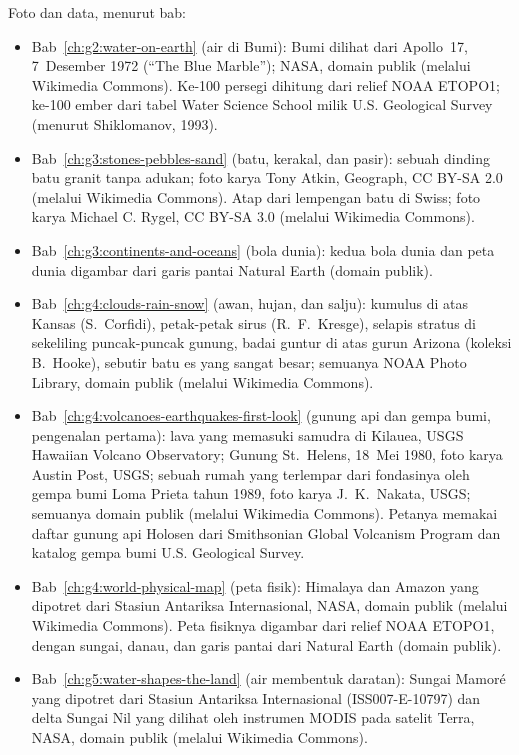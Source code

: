 \bigskip
\noindent Foto dan data, menurut bab:
\begin{itemize}\small
  \item Bab~\ref{ch:g2:water-on-earth} (air di Bumi): Bumi dilihat dari Apollo~17, 7~Desember 1972 (``The Blue Marble''); NASA, domain publik (melalui Wikimedia Commons). Ke-100 persegi dihitung dari relief NOAA ETOPO1; ke-100 ember dari tabel Water Science School milik U.S. Geological Survey (menurut Shiklomanov, 1993).
  \item Bab~\ref{ch:g3:stones-pebbles-sand} (batu, kerakal, dan pasir): sebuah dinding batu granit tanpa adukan; foto karya Tony Atkin, Geograph, CC BY-SA 2.0 (melalui Wikimedia Commons). Atap dari lempengan batu di Swiss; foto karya Michael C. Rygel, CC BY-SA 3.0 (melalui Wikimedia Commons).
  \item Bab~\ref{ch:g3:continents-and-oceans} (bola dunia): kedua bola dunia dan peta dunia digambar dari garis pantai Natural Earth (domain publik).
  \item Bab~\ref{ch:g4:clouds-rain-snow} (awan, hujan, dan salju): kumulus di atas Kansas (S.~Corfidi), petak-petak sirus (R.~F.~Kresge), selapis stratus di sekeliling puncak-puncak gunung, badai guntur di atas gurun Arizona (koleksi B.~Hooke), sebutir batu es yang sangat besar; semuanya NOAA Photo Library, domain publik (melalui Wikimedia Commons).
  \item Bab~\ref{ch:g4:volcanoes-earthquakes-first-look} (gunung api dan gempa bumi, pengenalan pertama): lava yang memasuki samudra di Kilauea, USGS Hawaiian Volcano Observatory; Gunung St.~Helens, 18~Mei 1980, foto karya Austin Post, USGS; sebuah rumah yang terlempar dari fondasinya oleh gempa bumi Loma Prieta tahun 1989, foto karya J.~K.~Nakata, USGS; semuanya domain publik (melalui Wikimedia Commons). Petanya memakai daftar gunung api Holosen dari Smithsonian Global Volcanism Program dan katalog gempa bumi U.S. Geological Survey.
  \item Bab~\ref{ch:g4:world-physical-map} (peta fisik): Himalaya dan Amazon yang dipotret dari Stasiun Antariksa Internasional, NASA, domain publik (melalui Wikimedia Commons). Peta fisiknya digambar dari relief NOAA ETOPO1, dengan sungai, danau, dan garis pantai dari Natural Earth (domain publik).
  \item Bab~\ref{ch:g5:water-shapes-the-land} (air membentuk daratan): Sungai Mamoré yang dipotret dari Stasiun Antariksa Internasional (ISS007-E-10797) dan delta Sungai Nil yang dilihat oleh instrumen MODIS pada satelit Terra, NASA, domain publik (melalui Wikimedia Commons).

\end{itemize}
